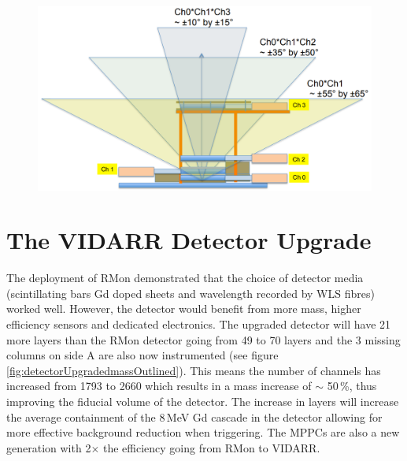 \begin{figure}[!h]
 \centering
 \includegraphics[width=0.7\linewidth]{Chapter2/Figs/Raster/Prospect_MuonPaddels.png}
 \label{fig:Prospect_MuonPaddels}
\end{figure}

\vspace{3cm}

\section{The VIDARR Detector Upgrade}\label{sec:theUpgradedDetector}
The deployment of RMon demonstrated that the choice of detector media (scintillating bars Gd doped sheets and wavelength recorded by WLS fibres) worked well. However, the detector would benefit from more mass, higher efficiency sensors and dedicated electronics. The upgraded detector will have 21 more layers than the RMon detector going from 49 to 70 layers and the 3 missing columns on side A are also now instrumented (see figure \ref{fig:detectorUpgradedmassOutlined}). This means the number of channels has increased from 1793 to 2660 which results in a mass increase of $\sim$ 50\,\%, thus improving the fiducial volume of the detector. The increase in layers will increase the average containment of the 8\,MeV Gd cascade in the detector allowing for more effective background reduction when triggering. The MPPCs are also a new generation with 2$\times$ the efficiency going from RMon to VIDARR. %

